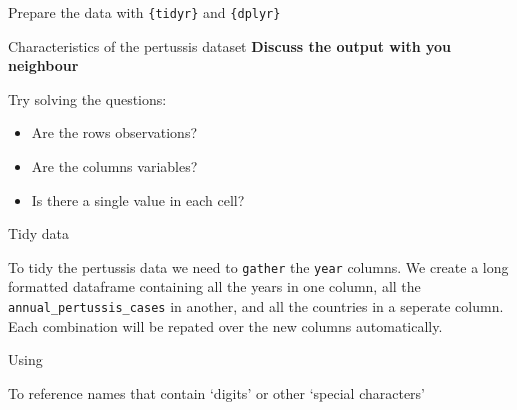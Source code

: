 \documentclass[ignorenonframetext,]{beamer}
\newenvironment{Shaded}{\begin{snugshade}}{\end{snugshade}}
\newcommand{\DataTypeTok}[1]{\textcolor[rgb]{0.13,0.29,0.53}{#1}}
\newcommand{\DecValTok}[1]{\textcolor[rgb]{0.00,0.00,0.81}{#1}}
\newcommand{\KeywordTok}[1]{\textcolor[rgb]{0.13,0.29,0.53}{\textbf{#1}}}
\newcommand{\NormalTok}[1]{#1}
\newcommand{\OperatorTok}[1]{\textcolor[rgb]{0.81,0.36,0.00}{\textbf{#1}}}
\newcommand{\StringTok}[1]{\textcolor[rgb]{0.31,0.60,0.02}{#1}}
\providecommand{\tightlist}{%
  \setlength{\itemsep}{0pt}\setlength{\parskip}{0pt}}
\begin{document}
\begin{frame}[fragile]{Prepare the data with \texttt{\{tidyr\}} and
\texttt{\{dplyr\}}}
\begin{block}{Characteristics of the pertussis dataset}
\textbf{Discuss the output with you neighbour}

Try solving the questions:

\begin{itemize}
\tightlist
\item
  Are the rows observations?
\item
  Are the columns variables?
\item
  Is there a single value in each cell?
\end{itemize}

\end{block}

\begin{block}{Tidy data}

To tidy the pertussis data we need to \texttt{gather} the \texttt{year}
columns. We create a long formatted dataframe containing all the years
in one column, all the \texttt{annual\_pertussis\_cases} in another, and
all the countries in a seperate column. Each combination will be repated
over the new columns automatically.

\begin{Shaded}
\end{Shaded}

\end{block}

\begin{block}{Using \texttt{\textasciigrave{}}}

To reference names that contain `digits' or other `special characters'

\begin{Shaded}
\end{Shaded}


\end{block}
\end{frame}
\end{document}

